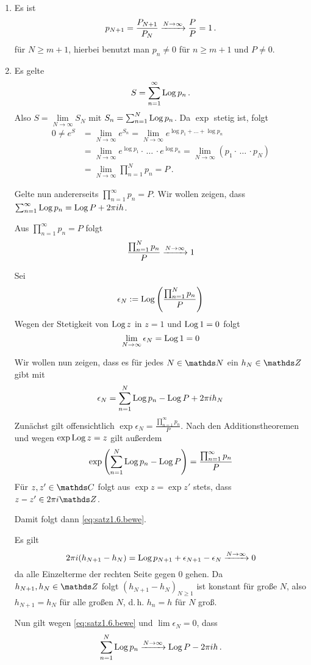 \begin{bewe}
\begin{enumerate}
\item Es ist
\[
	p_{N+1}
	= \frac{P_{N+1}}{P_N}
	\xrightarrow{N\to\infty} \frac{P}{P}
	= 1
	\,.
\]
für $N\geq m+1$, hierbei benutzt man $p_n \not= 0$ für $n\geq m+1$ und $P \not= 0$.

\item Es gelte
\[
	S
	= \sum _{n=1}^\infty \operatorname{Log} p_n
	\,.
\]
Also $S = \lim \limits _{N\to\infty} S_N$ mit $S_n = \sum_{n=1}^N \operatorname{Log} p_n$.
Da $\exp$ stetig ist, folgt
\begin{align*}
	0
	\not= e^S
	&= \lim _ {N\to \infty} e^{S_n} = \lim_{N\to\infty} e^{\log p_1 + \ldots + \log p_n} \\
	&= \lim _ {N\to \infty} e^{\log p_1} \cdot\,\ldots\,\cdot e^{\log p_n}
	= \lim _ {N\to \infty} (p_1 \cdot\,\ldots\,\cdot p_N) \\
	&= \lim _ {N\to \infty} \prod _{n=1}^N p_n
	= P
	\,.
\end{align*}

Gelte nun andererseits $\prod_{n=1}^\infty p_n = P$.
Wir wollen zeigen, dass $\sum _{n=1}^\infty \operatorname{Log} p_n = \operatorname{Log} P + 2\pi ih$.

Aus $\prod_{n=1}^\infty p_n = P$ folgt
\[
	\frac{\prod_{n=1}^N p_n}{P} \xrightarrow{N\to\infty} 1
\]

Sei
\[
	\epsilon_N := \operatorname{Log} \left(\frac{\prod_{n=1}^N p_n}{P}\right)
\]
Wegen der Stetigkeit von $\operatorname{Log} z$ in $z=1$ und $\operatorname{Log} 1 = 0$ folgt
\[
	\lim_{N\to\infty}\epsilon_N = \operatorname{Log} 1 = 0
\]

Wir wollen nun zeigen, dass es für jedes $N\in\NN$ ein $h_N\in\ZZ$ gibt mit
\begin{equation}\label{eq:satz1.6.bewe}
	\epsilon_N = \sum_{n=1}^N \operatorname{Log} p_n - \operatorname{Log} P + 2\pi i h_N
\end{equation}
Zunächst gilt  offensichtlich $\exp \epsilon_N = \frac{\prod_{n=1}^\infty p_n}{P}$.
Nach den Additionstheoremen und wegen $\exp\operatorname{Log} z = z$ gilt außerdem
\[
	\exp \left(\sum_{n=1}^N \operatorname{Log} p_n - \operatorname{Log} P\right)
	= \frac{\prod_{n=1}^\infty p_n}{P}
\]
Für $z, z' \in \CC$ folgt aus $\exp z = \exp z'$ stets, dass $z-z'\in 2\pi i\ZZ$.

Damit folgt dann \eqref{eq:satz1.6.bewe}.

Es gilt
\[
	2\pi i(h_{N+1}-h_N) = \operatorname{Log} p_{N+1} + \epsilon_{N+1}-\epsilon_N \xrightarrow{N\to\infty} 0
\]
da alle Einzelterme der rechten Seite gegen 0 gehen.
Da $h_{N+1}, h_N\in\ZZ$ folgt $(h_{N+1} - h_N)_{N\geq 1}$ ist konstant für große $N$, also $h_{N+1} = h_N$ für alle großen $N$, d.\,h. $h_n = h$ für $N$ groß.

Nun gilt wegen \eqref{eq:satz1.6.bewe} und $\lim \epsilon_N = 0$, dass
\[
	\sum_{n=1}^N \operatorname{Log} p_n
	\xrightarrow{N\to\infty}
	\operatorname{Log} P - 2\pi i h
	\,.
\]
\end{enumerate}
\end{bewe}

